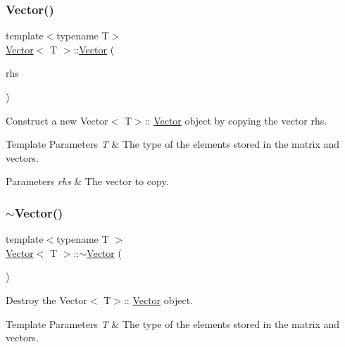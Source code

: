 \subsubsection{\texorpdfstring{Vector()}{Vector()}\hspace{0.1cm}{\footnotesize\ttfamily [5/5]}}
{\footnotesize\ttfamily template$<$typename T$>$ \\
\mbox{\hyperlink{classVector}{Vector}}$<$ T $>$\+::\mbox{\hyperlink{classVector}{Vector}} (\begin{DoxyParamCaption}\item[{const \mbox{\hyperlink{classVector}{Vector}}$<$ T $>$ \&}]{rhs }\end{DoxyParamCaption})}



Construct a new Vector$<$ T$>$\+:\+: \mbox{\hyperlink{classVector}{Vector}} object by copying the vector {\ttfamily rhs}. 


\begin{DoxyTemplParams}{Template Parameters}
{\em T} & The type of the elements stored in the matrix and vectors. \\
\hline
\end{DoxyTemplParams}

\begin{DoxyParams}{Parameters}
{\em rhs} & The vector to copy. \\
\hline
\end{DoxyParams}
\mbox{\label{classVector_afd524fac19e6d3d69db5198ffe2952b0}} 
\subsubsection{\texorpdfstring{$\sim$\+Vector()}{~Vector()}}
{\footnotesize\ttfamily template$<$typename T $>$ \\
\mbox{\hyperlink{classVector}{Vector}}$<$ T $>$\+::$\sim$\mbox{\hyperlink{classVector}{Vector}} (\begin{DoxyParamCaption}{ }\end{DoxyParamCaption})}



Destroy the Vector$<$ T$>$\+:\+: \mbox{\hyperlink{classVector}{Vector}} object. 


\begin{DoxyTemplParams}{Template Parameters}
{\em T} & The type of the elements stored in the matrix and vectors. \\
\hline
\end{DoxyTemplParams}


